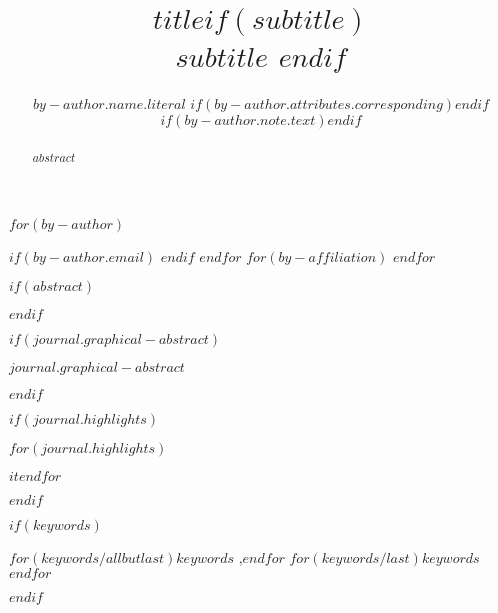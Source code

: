 
\begin{frontmatter}
\title{$title$$if(subtitle)$ \\\large{$subtitle$} $endif$}
$for(by-author)$\author[$for(by-author.affiliations)$$it.number$$sep$,$endfor$]{$by-author.name.literal$%
$if(by-author.attributes.corresponding)$$endif$%
$if(by-author.note.text)$$endif$}
$if(by-author.email)$  $endif$
$endfor$
$for(by-affiliation)$
$endfor$
        
$if(abstract)$
\begin{abstract}
$abstract$
\end{abstract}
$endif$

$if(journal.graphical-abstract)$\begin{graphicalabstract}
$journal.graphical-abstract$
\end{graphicalabstract}
$endif$

$if(journal.highlights)$\begin{highlights}
$for(journal.highlights)$\item $it$$endfor$
\end{highlights}
$endif$

$if(keywords)$
\begin{keyword}
    $for(keywords/allbutlast)$$keywords$ \sep $endfor$
    $for(keywords/last)$$keywords$$endfor$
\end{keyword}
$endif$
\end{frontmatter}
    